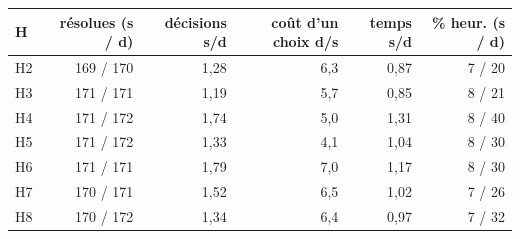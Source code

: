 \begin{tabular}{lrrrrr}
\toprule
H & résolues (s / d) & décisions s/d & coût d'un choix d/s & temps s/d & \% heur. (s / d) \\
\midrule
H2 & 169 / 170 & 1{,}28 & 6{,}3 & 0{,}87 & 7 / 20 \\
H3 & 171 / 171 & 1{,}19 & 5{,}7 & 0{,}85 & 8 / 21 \\
H4 & 171 / 172 & 1{,}74 & 5{,}0 & 1{,}31 & 8 / 40 \\
H5 & 171 / 172 & 1{,}33 & 4{,}1 & 1{,}04 & 8 / 30 \\
H6 & 171 / 171 & 1{,}79 & 7{,}0 & 1{,}17 & 8 / 30 \\
H7 & 170 / 171 & 1{,}52 & 6{,}5 & 1{,}02 & 7 / 26 \\
H8 & 170 / 172 & 1{,}34 & 6{,}4 & 0{,}97 & 7 / 32 \\
\bottomrule
\end{tabular}
